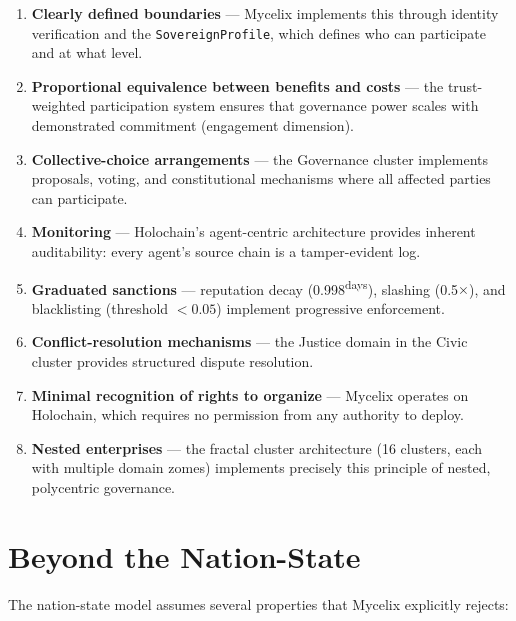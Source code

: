 \documentclass[12pt]{book}
\begin{document}
\begin{enumerate}
  \item \textbf{Clearly defined boundaries} --- Mycelix implements this through
    identity verification and the \texttt{SovereignProfile}, which defines
    who can participate and at what level.
  \item \textbf{Proportional equivalence between benefits and costs} --- the
    trust-weighted participation system ensures that governance power scales with
    demonstrated commitment (engagement dimension).
  \item \textbf{Collective-choice arrangements} --- the Governance cluster
    implements proposals, voting, and constitutional mechanisms where all
    affected parties can participate.
  \item \textbf{Monitoring} --- Holochain's agent-centric architecture provides
    inherent auditability: every agent's source chain is a tamper-evident log.
  \item \textbf{Graduated sanctions} --- reputation decay (0.998\textsuperscript{days}),
    slashing (0.5$\times$), and blacklisting (threshold $<0.05$) implement
    progressive enforcement.
  \item \textbf{Conflict-resolution mechanisms} --- the Justice domain in the Civic
    cluster provides structured dispute resolution.
  \item \textbf{Minimal recognition of rights to organize} --- Mycelix operates
    on Holochain, which requires no permission from any authority to deploy.
  \item \textbf{Nested enterprises} --- the fractal cluster architecture
    (16 clusters, each with multiple domain zomes) implements precisely this
    principle of nested, polycentric governance.
\end{enumerate}

\section{Beyond the Nation-State}

The nation-state model assumes several properties that Mycelix explicitly rejects:
\end{document}
